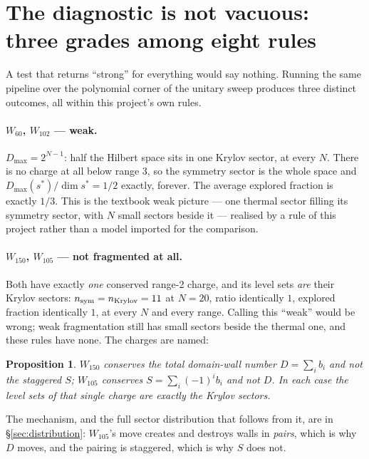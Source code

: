 \documentclass[11pt]{article}
\theoremstyle{plain}
\newtheorem{proposition}{Proposition}
\begin{document}
\section{The diagnostic is not vacuous: three grades among eight rules}
\label{sec:controls}

A test that returns ``strong'' for everything would say nothing. Running the
same pipeline over the polynomial corner of the unitary sweep produces three
distinct outcomes, all within this project's own rules.

\paragraph{$W_{60}$, $W_{102}$ --- weak.} $D_{\max}=2^{N-1}$: half the Hilbert
space sits in one Krylov sector, at every $N$. There is no charge at all below
range 3, so the symmetry sector is the whole space and
$D_{\max}(s^*)/\dim s^* = 1/2$ exactly, forever. The average explored fraction
is exactly $1/3$. This is the textbook weak picture --- one thermal sector
filling its symmetry sector, with $N$ small sectors beside it --- realised by a
rule of this project rather than a model imported for the comparison.

\paragraph{$W_{150}$, $W_{105}$ --- not fragmented at all.} Both have exactly
\emph{one} conserved range-2 charge, and its level sets \emph{are} their Krylov
sectors: $n_{\rm sym} = n_{\rm Krylov} = 11$ at $N=20$, ratio identically $1$,
explored fraction identically $1$, at every $N$ and every range. Calling this
``weak'' would be wrong; weak fragmentation still has small sectors beside the
thermal one, and these rules have none. The charges are named:

\begin{proposition}
$W_{150}$ conserves the total domain-wall number $D = \sum_i b_i$ and not the
staggered $S$; $W_{105}$ conserves $S = \sum_i (-1)^i b_i$ and not $D$. In each
case the level sets of that single charge are exactly the Krylov sectors.
\end{proposition}

\noindent The mechanism, and the full sector distribution that follows from it,
are in \S\ref{sec:distribution}: $W_{105}$'s move creates and destroys walls in
\emph{pairs}, which is why $D$ moves, and the pairing is staggered, which is why
$S$ does not.
\end{document}
